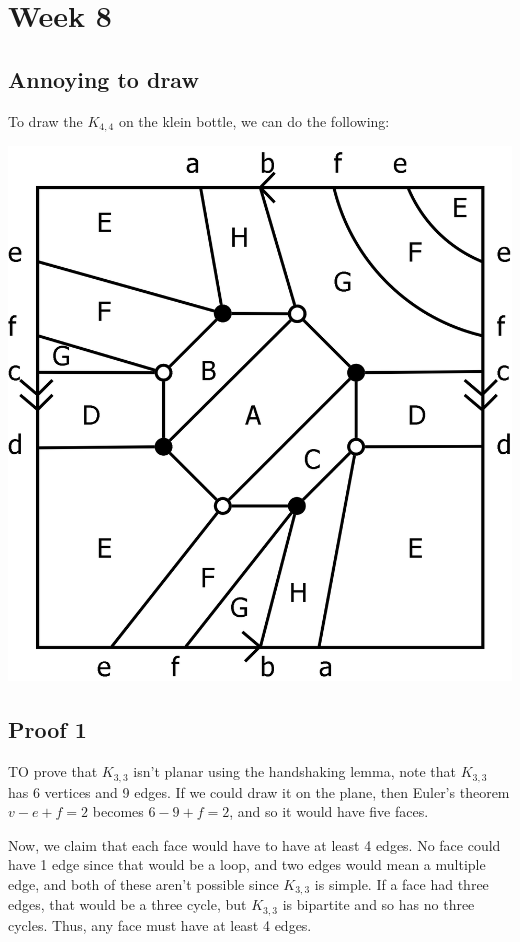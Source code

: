 \documentclass{amsart}
\begin{document}
\section{Week 8}

\subsection{Annoying to draw}

To draw the $K_{4,4}$ on the klein bottle, we can do the following:

\begin{center}
\includegraphics[width=\textwidth]{kleink-4-4.png}
\end{center}


\subsection{Proof 1}

TO prove that $K_{3,3}$ isn't planar using the handshaking lemma, note that $K_{3,3}$ has 6 vertices and 9 edges.  If we could draw it on the plane, then Euler's theorem $v-e+f=2$ becomes $6-9+f=2$, and so it would have five faces.

Now, we claim that each face would have to have at least 4 edges.  No face could have 1 edge since that would be a loop, and two edges would mean a multiple edge, and both of these aren't possible since $K_{3,3}$ is simple.  If a face had three edges, that would be a three cycle, but $K_{3,3}$ is bipartite and so has no three cycles.  Thus, any face must have at least 4 edges.
\end{document}
